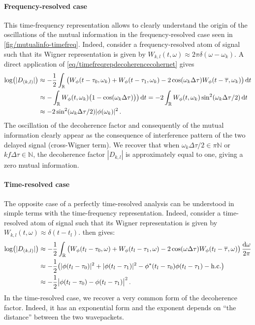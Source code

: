 \paragraph{Frequency-resolved case}
This time-frequency representation allows to clearly
understand the origin of the oscillations of the mutual
information in the frequency-resolved case seen in
\cref{fig/mutualinfo-timefreq}. Indeed, consider a 
frequency-resolved atom of signal such that its Wigner
representation is given by 
$W_{k,l}(t,\omega) \approx 2\pi \delta(\omega-\omega_k)$.
A direct application of \cref{eq/timefreqrepdecoherencecohernet}
gives
%
\begin{subequations}
\label{eq/decofactfreqresol}
\begin{align}
\log(|D_{(k,l)}|) & \approx -\frac{1}{2} 
	\int_{\mathbb{R}} 
		\big(W_\phi(t-\tau_0,\omega_k) 
		+ W_\phi(t-\tau_1,\omega_k) 
		-2 \cos(\omega_k\Delta\tau)  W_\phi(t-\overline{\tau},\omega_k)
		\big)
	\, \mathrm{d} t
\\
&\approx
	-\int_{\mathbb{R}}
		W_\phi(t,\omega_k) 
		\big(1- \cos(\omega_k\Delta\tau) \big)
		\big)
	\, \mathrm{d} t
=-2\int_{\mathbb{R}}
		W_\phi(t,\omega_k) 
		\sin^2(\omega_k\Delta\tau/2)
	\, \mathrm{d} t
\\
&\approx
-2\sin^2(\omega_k\Delta\tau/2) |\phi(\omega_k)|^2
\,.
\end{align}
\end{subequations}
The oscillation of the decoherence factor and consequently
of the mutual information clearly appear as the consequence
of interference pattern of the two delayed signal (cross-Wigner
term). We recover that when 
$\omega_k \Delta\tau/2 \in \pi\mathbb{N}$ or
$kf\Delta\tau \in \mathbb{N}$, the decoherence factor
$|D_{k,l}|$ is approximately equal to one, giving a zero
mutual information.

\paragraph{Time-resolved case}
The opposite case of a perfectly time-resolved analysis 
can be understood in simple terms with the time-frequency
representation. Indeed, consider a time-resolved atom of signal
such that its Wigner representation is given by 
$W_{k,l}(t,\omega) \approx \delta(t-t_l)$.
 then gives:
%
\begin{align}
\log(|D_{(k,l)}|) 
&\approx
-\frac{1}{2} 
	\int_{\mathbb{R}} 
		\big(W_\phi(t_l-\tau_0,\omega) 
		+ W_\phi(t_l-\tau_1,\omega) 
		-2 \cos(\omega\Delta\tau)  W_\phi(t_l-\overline{\tau},\omega)
		\big)
	\, \frac{\mathrm{d}\omega}{2\pi}
\\
&
\approx 
-\frac{1}{2}
\big(
	|\phi(t_l-\tau_0)|^2 + |\phi(t_l-\tau_1)|^2
	-\phi^*(t_l-\tau_0)\phi(t_l-\tau_1) - \text{h.c.}
\big)
\\
&
\approx 
-\frac{1}{2} \big| \phi(t_l-\tau_0) - \phi(t_l-\tau_1) \big|^2
\,.
\end{align}
In the time-resolved case, we recover a very common
form of the decoherence factor. Indeed, it has an exponential
form and the exponent depends on ``the distance'' between 
the two wavepackets.

